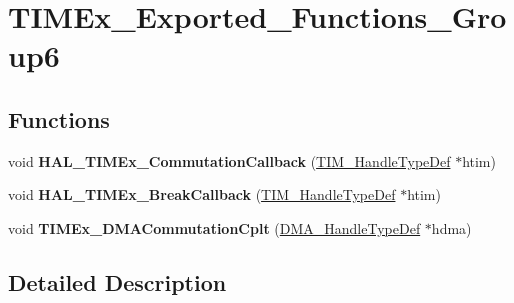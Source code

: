 \hypertarget{group___t_i_m_ex___exported___functions___group6}{}\section{T\+I\+M\+Ex\+\_\+\+Exported\+\_\+\+Functions\+\_\+\+Group6}
\label{group___t_i_m_ex___exported___functions___group6}
\subsection*{Functions}
\begin{DoxyCompactItemize}
\item 
void {\bfseries H\+A\+L\+\_\+\+T\+I\+M\+Ex\+\_\+\+Commutation\+Callback} (\hyperlink{struct_t_i_m___handle_type_def}{T\+I\+M\+\_\+\+Handle\+Type\+Def} $\ast$htim)\hypertarget{group___t_i_m_ex___exported___functions___group6_ga5b08c045ccb306ada81a0c8436a0c1ec}{}\label{group___t_i_m_ex___exported___functions___group6_ga5b08c045ccb306ada81a0c8436a0c1ec}

\item 
void {\bfseries H\+A\+L\+\_\+\+T\+I\+M\+Ex\+\_\+\+Break\+Callback} (\hyperlink{struct_t_i_m___handle_type_def}{T\+I\+M\+\_\+\+Handle\+Type\+Def} $\ast$htim)\hypertarget{group___t_i_m_ex___exported___functions___group6_ga2d868a55ca7c62c4a5ef85dec514402c}{}\label{group___t_i_m_ex___exported___functions___group6_ga2d868a55ca7c62c4a5ef85dec514402c}

\item 
void {\bfseries T\+I\+M\+Ex\+\_\+\+D\+M\+A\+Commutation\+Cplt} (\hyperlink{group___d_m_a___exported___types_ga41b754a906b86bce54dc79938970138b}{D\+M\+A\+\_\+\+Handle\+Type\+Def} $\ast$hdma)\hypertarget{group___t_i_m_ex___exported___functions___group6_gaf473fa38254d62a74a006a781fe0aeb8}{}\label{group___t_i_m_ex___exported___functions___group6_gaf473fa38254d62a74a006a781fe0aeb8}

\end{DoxyCompactItemize}


\subsection{Detailed Description}
